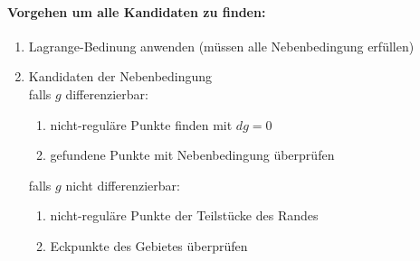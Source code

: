 \documentclass[11pt]{article}
\begin{document}
\paragraph{Vorgehen um alle Kandidaten zu finden:}
\begin{enumerate}[noitemsep]
	\item Lagrange-Bedinung anwenden (m{\"u}ssen alle Nebenbedingung erf{\"u}llen)
	\item Kandidaten der Nebenbedingung \\
	falls $g$ differenzierbar: 
	\begin{enumerate}[noitemsep]
		\item nicht-regul{\"a}re Punkte finden mit $dg = 0$
		\item gefundene Punkte mit Nebenbedingung {\"u}berpr{\"u}fen
	\end{enumerate}
	falls $g$ nicht differenzierbar:
	\begin{enumerate}[noitemsep]
		\item nicht-regul{\"a}re Punkte der Teilst{\"u}cke des Randes
		\item Eckpunkte des Gebietes {\"u}berpr{\"u}fen
	\end{enumerate}
\end{enumerate}
\end{document}
